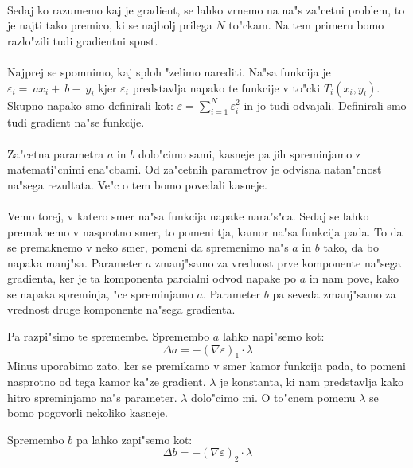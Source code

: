 \paragraph{}
Sedaj ko razumemo kaj je gradient, se lahko vrnemo na na"s za"cetni problem, to je najti tako premico, ki se najbolj prilega $N$ to"ckam. Na tem primeru bomo razlo"zili tudi gradientni spust.

\paragraph{}
Najprej se spomnimo, kaj sploh "zelimo narediti. Na"sa funkcija je $\varepsilon_i = ~ax_i + ~b - ~y_i$ kjer $\varepsilon_i$ predstavlja napako te funkcije v to"cki $T_i(x_i, y_i)$. Skupno napako smo definirali kot: $\varepsilon = \sum_{i=1}^{N} \varepsilon_i^2$ in jo tudi odvajali. Definirali smo tudi gradient na"se funkcije.


\paragraph{}
Za"cetna parametra $a$ in $b$ dolo"cimo sami, kasneje pa jih spreminjamo z matemati"cnimi ena"cbami. Od za"cetnih parametrov je odvisna natan"cnost na"sega rezultata. Ve"c o tem bomo povedali kasneje.

\paragraph{}
Vemo torej, v katero smer na"sa funkcija napake nara"s"ca. Sedaj se lahko premaknemo v nasprotno smer, to pomeni tja, kamor na"sa funkcija pada. To da se premaknemo v neko smer, pomeni da spremenimo na"s $a$ in $b$ tako, da bo napaka manj"sa. Parameter $a$ zmanj"samo za vrednost prve komponente na"sega gradienta, ker je ta komponenta parcialni odvod napake po $a$ in nam pove, kako se napaka spreminja, "ce spreminjamo $a$. Parameter $b$ pa seveda zmanj"samo za vrednost druge komponente na"sega gradienta.

Pa razpi"simo te spremembe. Spremembo $a$ lahko napi"semo kot:
\[\Delta a = -(\nabla \varepsilon)_1 \cdot \lambda\]
Minus uporabimo zato, ker se premikamo v smer kamor funkcija pada, to pomeni nasprotno od tega kamor ka"ze gradient. $\lambda$ je konstanta, ki nam predstavlja kako hitro spreminjamo na"s parameter. $\lambda$ dolo"cimo mi. O to"cnem pomenu $\lambda$ se bomo pogovorli nekoliko kasneje.

Spremembo $b$ pa lahko zapi"semo kot:
\[\Delta b = -(\nabla \varepsilon)_2 \cdot \lambda\]

